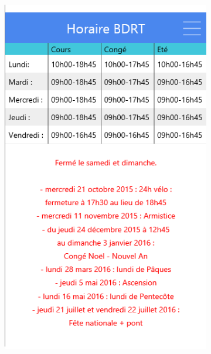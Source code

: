 \documentclass{eplmastersthesis}
\begin{document}
\begin{figure}[H]
    \centering
\begin{subfigure}[b]{0.3\textwidth}
        \includegraphics[width=\textwidth]{Images/InVision/horaire-bibli.png}
    \end{subfigure}
    ~ %
    \begin{subfigure}[b]{0.3\textwidth}

\end{subfigure}
\end{figure}
\end{document}
